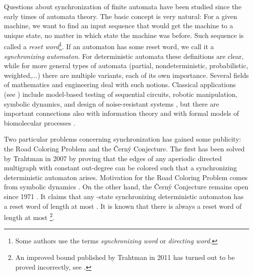 \documentclass{ws-ijmpc}
\begin{document}
Questions about synchronization of finite automata have been studied
since the early times of automata theory. The basic concept is very
natural: For a given machine, we want to find an input sequence that
would get the machine to a unique state, no matter in which state
the machine was before. Such sequence is called a \emph{reset word}\footnote{Some authors use the terms \emph{synchronizing word} or \emph{directing
word}.}. If an automaton has some reset word, we call it a \emph{synchronizing}
\emph{automaton}. For deterministic automata these definitions are
clear, while for more general types of automata (partial, nondeterministic,
probabilistic, weighted,...) there are multiple variants, each of
its own importance. Several fields of mathematics and engineering
deal with such notions. Classical applications (see \citep{VOL1short})
include model-based testing of sequential circuits, robotic manipulation,
symbolic dynamics, and design of noise-resistant systems \citep{DEY1},
but there are important connections also with information theory \citep{TRS1}
and with formal models of biomolecular processes \citep{BON1}. 

Two particular problems concerning synchronization has gained some
publicity: the Road Coloring Problem and the \v{C}ern\'{y} Conjecture.
The first has been solved by Trahtman \citep{TRA6ijm} in 2007 by
proving that the edges of any aperiodic directed multigraph with constant
out-degree can be colored such that a synchronizing deterministic
automaton arises. Motivation for the Road Coloring Problem comes from
symbolic dynamics \citep{ADL1}. On the other hand, the \v{C}ern\'{y}
Conjecture remains open since 1971 \citep{CER2}. It claims that any
-state synchronizing deterministic automaton has a reset word
of length at most . It is known that there
is always a reset word of length at most  \citep{PIN2}\footnote{An improved bound published by Trahtman \citep{TRA1} in 2011 has
turned out to be proved incorrectly, see \citep{GON1}.}.
\end{document}

